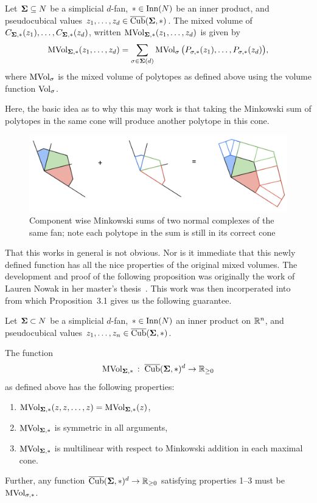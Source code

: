 \documentclass[12pt,oneside]{../../sfsuthesis}
\begin{document}
\begin{definition}\th\label{def:mixedVolNormalComplex}
    Let \( \bm{\Sigma} \subseteq N \) be a simplicial \( d \)-fan, \( \ast \in \operatorname{Inn}(N) \) be an inner product, and pseudocubical values \( z_1, \dots, z_d \in \operatorname{\overline{Cub}}(\bm{\Sigma}, \ast)\).
    The mixed volume of \( C_{\bm{\Sigma}, \ast}(z_1), \dots, C_{\bm{\Sigma}, \ast}(z_d) \), written \( \operatorname{MVol}_{\bm{\Sigma}, \ast}(z_1, \dots, z_d ) \) is given by
    \[
        \operatorname{MVol}_{\bm{\Sigma}, \ast}(z_1, \dots, z_d ) = \sum_{\sigma \in \bm{\Sigma}(d)} \operatorname{MVol}_\sigma\big(P_{\sigma, \ast}(z_1), \dots, P_{\sigma, \ast}(z_d)\big),
    \]
    where \( \operatorname{MVol}_\sigma \) is the mixed volume of polytopes as defined above using the volume function \( \operatorname{Vol}_\sigma \).
\end{definition}
Here, the basic idea as to why this may work is that taking the Minkowski sum of polytopes in the same cone will produce another polytope in this cone.
\begin{figure}[H]
    \centering
    \includegraphics[width=1.05\textwidth]{./images/mvol_ex}
    \caption{Component wise Minkowski sums of two normal complexes of the same fan; note each polytope in the sum is still in its correct cone}
\end{figure}
That this works in general is not obvious.
Nor is it immediate that this newly defined function has all the nice properties of the original mixed volumes.
The development and proof of the following proposition was originally the work of Lauren Nowak in her master's thesis~\cite{nowakMixedVolumesNormal2022}.
This work was then incorperated into~\cite{nowakMixedVolumesNormal2023} from which Proposition~3.1 gives us the following guarantee.
\begin{proposition}
    Let \( \bm{\Sigma} \subset N \) be a simplicial \( d \)-fan, \( \ast \in \operatorname{Inn}(N) \) an inner product on \( \mathbb{R}^n \), and  pseudocubical values \( z_1, \dots, z_n \in \operatorname{\overline{Cub}}(\bm{\Sigma}, \ast)\).

    The function
    \[
        \operatorname{MVol}_{\bm{\Sigma}, \ast}\,:\; \operatorname{\overline{Cub}}(\bm{\Sigma}, \ast)^d \to \mathbb{R}_{\geq 0}
    \]
    as defined above has the following properties:
    \begin{enumerate}
        \item \( \operatorname{MVol}_{\bm{\Sigma}, \ast}(z, z, \dots, z) = \operatorname{MVol}_{\bm{\Sigma}, \ast}(z) \),
        \item \( \operatorname{MVol}_{\bm{\Sigma}, \ast} \) is symmetric in all arguments,
        \item \( \operatorname{MVol}_{\bm{\Sigma}, \ast} \) is multilinear with respect to Minkowski addition in each maximal cone.
    \end{enumerate}

    Further, any function \( \operatorname{\overline{Cub}}(\bm{\Sigma}, \ast)^d \to \mathbb{R}_{\geq 0} \) satisfying properties 1--3 must be \( \operatorname{MVol}_{\sigma, \ast} \).
\end{proposition}
\end{document}
